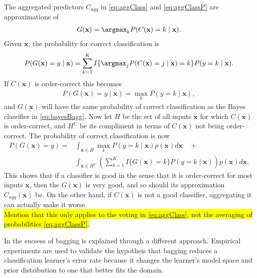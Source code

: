 The aggregated predictors $C_{agg}$ in \eqref{eq:aggClass} and \eqref{eq:aggClassP} are approximations of  
\begin{align}
  G(\mathbf{x}) = \argmax_k P(C(\mathbf{x})=k \mid \mathbf{x}).
\end{align}
Given $\mathbf{x}$, the probability for correct classification is 
\begin{align}
  P(G(\mathbf{x}) = y \mid \mathbf{x})  
  = \sum^{K}_{k=1} I\{ \argmax_j P(C(\mathbf{x}) = j \mid \mathbf{x}) = k \} P(y=k \mid \mathbf{x}).
\end{align}
If $C(\mathbf{x})$ is order-correct this becomes
\begin{align}
  P(G(\mathbf{x}) = y \mid \mathbf{x})  = \max_k P(y = k \mid \mathbf{x}),
\end{align}
and $G(\mathbf{x})$ will have the same probability of correct classification as the Bayes classifier in  \eqref{eq:bayesBagg}. Now let $H$ be the set of all inputs $\mathbf{x}$ for which $C(\mathbf{x})$ is order-correct, and $H^C$ be its compliment in terms of $C(\mathbf{x})$ not being order-correct. The probability of correct classification is now
\begin{align}
  P(G(\mathbf{x}) = y) = &\int_{\mathbf{x} \in H} \max_k P(y=k \mid \mathbf{x})  p(\mathbf{x}) d\mathbf{x} \quad + \\
  &\int_{\mathbf{x} \in H^C} \left(\sum^{K}_{k=1} I\{ G(\mathbf{x}) = k \} P(y=k \mid \mathbf{x})   \right) p(\mathbf{x}) d\mathbf{x}.
\end{align}
This shows that if a classifier is good in the sense that it is order-correct for most inputs $\mathbf{x}$, then the $G(\mathbf{x})$ is very good, and so should its approximation $C_{agg}(\mathbf{x})$ be. On the other hand, if $C(\mathbf{x})$ is not a good classifier, aggregating it can actually make it worse.
\\ \colorbox{yellow}{Mention that this only applies to the voting in \eqref{eq:aggClass}, not the averaging of probabilities \eqref{eq:aggClassP}. }

In \cite{domingos1997Bagging} the sucsess of bagging is explained through a different approach. Empirical experiments are used to validate the hypotheis that  
bagging reduces a classification learner's error rate because it changes the learner's model space and prior distribution to one that better fits the domain.

